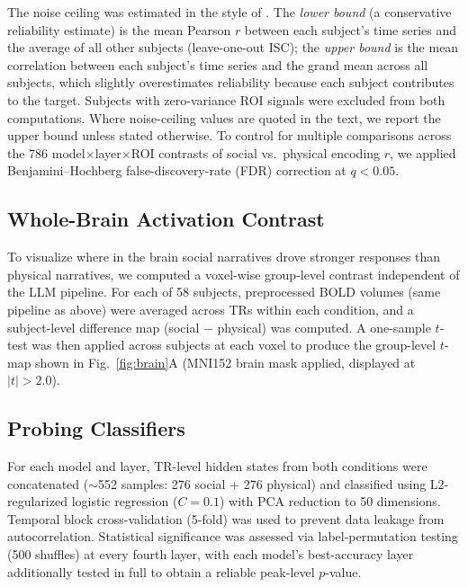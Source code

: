 \documentclass[conference]{IEEEtran}
\begin{document}
The noise ceiling was estimated in the style of \cite{kriegeskorte2008representational,nastase2021narratives}. The \emph{lower bound} (a conservative reliability estimate) is the mean Pearson $r$ between each subject's time series and the average of all other subjects (leave-one-out ISC); the \emph{upper bound} is the mean correlation between each subject's time series and the grand mean across all subjects, which slightly overestimates reliability because each subject contributes to the target. Subjects with zero-variance ROI signals were excluded from both computations. Where noise-ceiling values are quoted in the text, we report the upper bound unless stated otherwise. To control for multiple comparisons across the 786 model$\times$layer$\times$ROI contrasts of social vs.\ physical encoding $r$, we applied Benjamini--Hochberg false-discovery-rate (FDR) correction at $q < 0.05$.

\subsection{Whole-Brain Activation Contrast}

To visualize where in the brain social narratives drove stronger responses than physical narratives, we computed a voxel-wise group-level contrast independent of the LLM pipeline. For each of 58 subjects, preprocessed BOLD volumes (same pipeline as above) were averaged across TRs within each condition, and a subject-level difference map (social $-$ physical) was computed. A one-sample $t$-test was then applied across subjects at each voxel to produce the group-level $t$-map shown in Fig.~\ref{fig:brain}A (MNI152 brain mask applied, displayed at $|t|>2.0$).

\subsection{Probing Classifiers}

For each model and layer, TR-level hidden states from both conditions were concatenated ($\sim$552 samples: 276 social + 276 physical) and classified using L2-regularized logistic regression ($C = 0.1$) with PCA reduction to 50 dimensions. Temporal block cross-validation (5-fold) was used to prevent data leakage from autocorrelation. Statistical significance was assessed via label-permutation testing (500 shuffles) at every fourth layer, with each model's best-accuracy layer additionally tested in full to obtain a reliable peak-level $p$-value.
\end{document}

